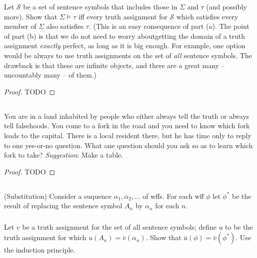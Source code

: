 \documentclass{report}
\begin{document}
  Let $\mathcal{S}$ be a set of sentence symbols that includes those in $\Sigma$
    and $\tau$ (and possibly more).
  Show that $\Sigma \vDash \tau$ iff every truth assignment for $\mathcal{S}$
    which satisfies every member of $\Sigma$ also satisfies $\tau$.
  (This is an easy consequence of part (a). The point of part (b) is that we do
    not need to worry aboutgetting the domain of a truth assignment
    \textit{exactly} perfect, as long as it is big enough. For example, one
    option would be always to use truth assignments on the set of \textit{all}
    sentence symbols. The drawback is that these are infinite objects, and there
    are a great many -- uncountably many -- of them.)

  \begin{proof}
    TODO
  \end{proof}

\subsection{}%

  You are in a land inhabited by people who either always tell the truth or
    always tell falsehoods.
  You come to a fork in the road and you need to know which fork leads to the
    capital.
  There is a local resident there, but he has time only to reply to one
    yes-or-no question.
  What one question should you ask so as to learn which fork to take?
  \textit{Suggestion}: Make a table.

  \begin{proof}
    TODO
  \end{proof}

\subsection{}%

  (Substitution) Consider a suquence $\alpha_1, \alpha_2, \ldots$ of wffs.
  For each wff $\phi$ let $\phi^*$ be the result of replacing the sentence
    symbol $A_n$ by $\alpha_n$ for each $n$.

\subsubsection{}%

  Let $v$ be a truth assignment for the set of all sentence symbols; define $u$
    to be the truth assignment for which $u(A_n) = \bar{v}(\alpha_n)$.
  Show that $\bar{u}(\phi) = \bar{v}(\phi^*)$.
  Use the induction principle.
\end{document}
